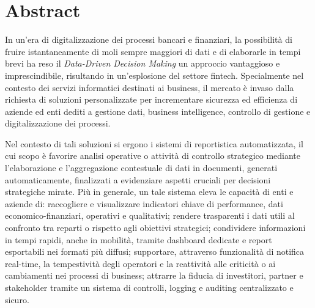 \chapter*{Abstract}
In un'era di digitalizzazione dei processi bancari e finanziari, la possibilità di fruire istantaneamente di moli sempre maggiori di dati e di elaborarle in tempi brevi ha reso il \emph{Data-Driven Decision Making} un approccio vantaggioso e imprescindibile, risultando in un'esplosione del settore fintech.
Specialmente nel contesto dei servizi informatici destinati ai business, il mercato è invaso dalla richiesta di soluzioni personalizzate per incrementare sicurezza ed efficienza di aziende ed enti dediti a gestione dati, business intelligence, controllo di gestione e digitalizzazione dei processi.

Nel contesto di tali soluzioni si ergono i sistemi di reportistica automatizzata, il cui scopo è favorire analisi operative o attività di controllo strategico mediante l'elaborazione e l'aggregazione contestuale di dati in documenti, generati automaticamente, finalizzati a evidenziare aspetti cruciali per decisioni strategiche mirate.
Più in generale, un tale sistema eleva le capacità di enti e aziende di: raccogliere e visualizzare indicatori chiave di performance, dati economico-finanziari, operativi e qualitativi; rendere trasparenti i dati utili al confronto tra reparti o rispetto agli obiettivi strategici; condividere informazioni in tempi rapidi, anche in mobilità, tramite dashboard dedicate e report esportabili nei formati più diffusi; supportare, attraverso funzionalità di notifica real-time, la tempestività degli operatori e la reattività alle criticità o ai cambiamenti nei processi di business; attrarre la fiducia di investitori, partner e stakeholder tramite un sistema di controlli, logging e auditing centralizzato e sicuro.

